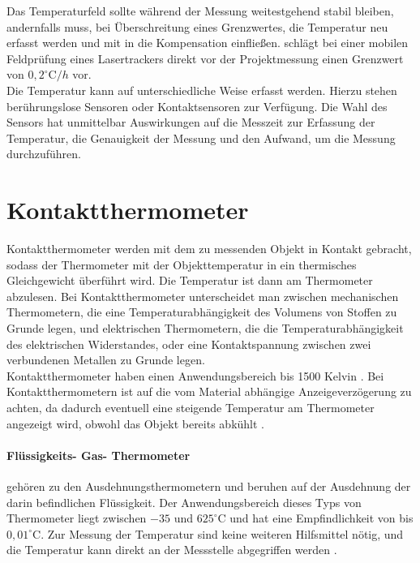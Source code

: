 Das Temperaturfeld sollte während der Messung weitestgehend stabil bleiben, andernfalls muss, bei Überschreitung eines Grenzwertes, die Temperatur neu erfasst werden und mit in die Kompensation einfließen. \cite{eschelbach2007} schlägt bei einer mobilen Feldprüfung eines Lasertrackers direkt vor der Projektmessung einen Grenzwert von $0,2^\circ\text{C}/h$ vor.\\
Die Temperatur kann auf unterschiedliche Weise erfasst werden. Hierzu stehen berührungslose Sensoren oder Kontaktsensoren zur Verfügung. Die Wahl des Sensors hat unmittelbar Auswirkungen auf die Messzeit zur Erfassung der Temperatur, die Genauigkeit der Messung und den Aufwand, um die Messung durchzuführen.

\section{Kontaktthermometer}\label{sec:Kontaktthermometer}

Kontaktthermometer werden mit dem zu messenden Objekt in Kontakt gebracht, sodass der Thermometer mit der Objekttemperatur in ein thermisches Gleichgewicht überführt wird. Die Temperatur ist dann am Thermometer abzulesen. Bei Kontaktthermometer unterscheidet man zwischen mechanischen Thermometern, die eine Temperaturabhängigkeit des Volumens von Stoffen zu Grunde legen, und elektrischen Thermometern, die die Temperaturabhängigkeit des elektrischen Widerstandes, oder eine Kontaktspannung zwischen zwei verbundenen Metallen zu Grunde legen. \\
Kontaktthermometer haben einen Anwendungsbereich bis 1500 Kelvin \cite{Siddiqi}. Bei Kontaktthermometern ist auf die vom Material abhängige Anzeigeverzögerung zu achten, da dadurch eventuell eine steigende Temperatur am Thermometer angezeigt wird, obwohl das Objekt bereits abkühlt \cite{Siddiqi}.

\paragraph{Flüssigkeits- Gas- Thermometer}\label{par:fluessiggasthermo}

 gehören zu den Ausdehnungsthermometern und beruhen auf der Ausdehnung der darin befindlichen Flüssigkeit. Der Anwendungsbereich dieses Typs von Thermometer liegt zwischen $-35$ und $625^\circ\text{C}$ und hat eine Empfindlichkeit von bis $0,01^\circ\text{C}$. Zur Messung der Temperatur sind keine weiteren Hilfsmittel nötig, und die Temperatur kann direkt an der Messstelle abgegriffen werden \cite{Siddiqi}.

